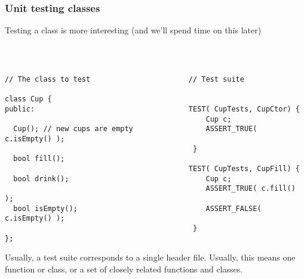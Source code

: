 \begin{frame}[fragile]
\frametitle{Unit testing classes}
Testing a class is more interesting (and we'll spend time on this later)
{\scriptsize\
\begin{verbatim}

// The class to test                       // Test suite

class Cup {
public:                                    TEST( CupTests, CupCtor) {
                                               Cup c;
  Cup(); // new cups are empty                 ASSERT_TRUE( c.isEmpty() );
                                            }
  bool fill();                            
                                           TEST( CupTests, CupFill) {
  bool drink();                                Cup c;
                                               ASSERT_TRUE( c.fill() );
  bool isEmpty();                              ASSERT_FALSE( c.isEmpty() );
                                            }
};
\end{verbatim}}
\vskip 6pt


Usually, a test suite corresponds to a single header file.  Usually,
this means one function or class, or a set of closely related
functions and classes.
\end{frame}
















